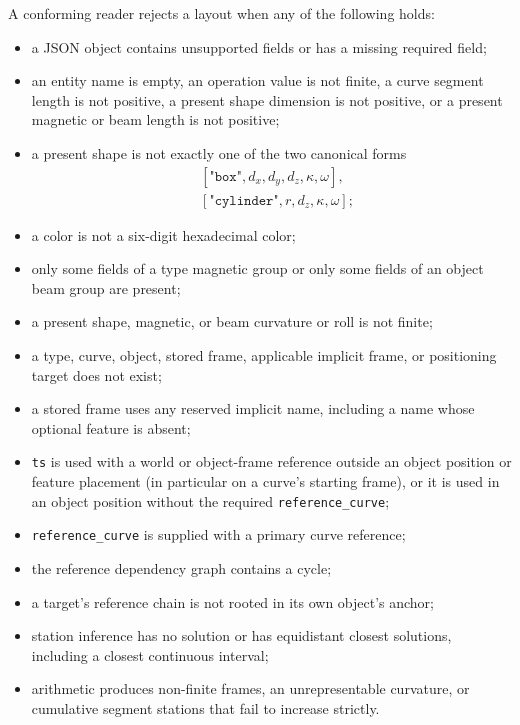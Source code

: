 \documentclass[11pt,a4paper]{article}
\begin{document}
A conforming reader rejects a layout when any of the following holds:
\begin{itemize}
  \item a JSON object contains unsupported fields or has a missing required
        field;
  \item an entity name is empty, an operation value is not finite, a curve
        segment length is not positive, a present shape dimension is not
        positive, or a present magnetic or beam length is not positive;
  \item a present shape is not exactly one of the two canonical forms
        \begin{align*}
          &[\texttt{"box"},d_x,d_y,d_z,\kappa,\omega],\\
          &[\texttt{"cylinder"},r,d_z,\kappa,\omega];
        \end{align*}
  \item a color is not a six-digit hexadecimal color;
  \item only some fields of a type magnetic group or only some fields of an object beam
        group are present;
  \item a present shape, magnetic, or beam curvature or roll is not finite;
  \item a type, curve, object, stored frame, applicable implicit frame, or
        positioning target does not exist;
  \item a stored frame uses any reserved implicit name, including a name whose
        optional feature is absent;
  \item \texttt{ts} is used with a world or object-frame reference outside an
        object position or feature placement (in particular on a curve's
        starting frame), or it is used in an object position without the
        required \texttt{reference\_curve};
  \item \texttt{reference\_curve} is supplied with a primary curve reference;
  \item the reference dependency graph contains a cycle;
  \item a target's reference chain is not rooted in its own object's anchor;
  \item station inference has no solution or has equidistant closest solutions,
        including a closest continuous interval;
  \item arithmetic produces non-finite frames, an unrepresentable curvature,
        or cumulative segment stations that fail to increase strictly.
\end{itemize}
\end{document}
